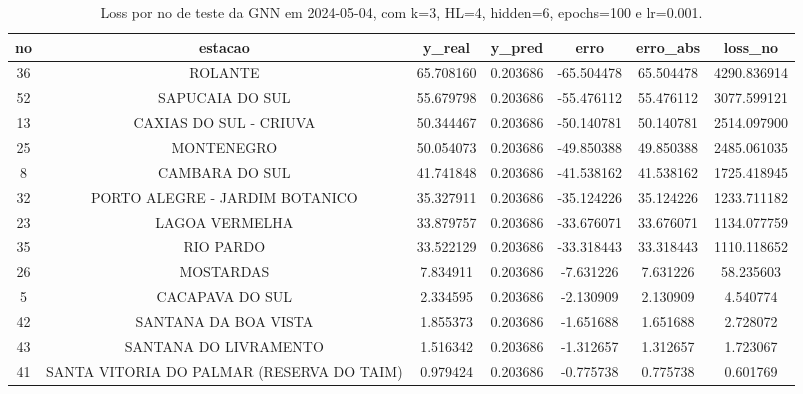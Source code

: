 \begin{table}[h]
\centering
\caption{Loss por no de teste da GNN em 2024-05-04, com k=3, HL=4, hidden=6, epochs=100 e lr=0.001.}
\label{tab:gnn_loss_k3_hl4_h6_e100_d20240504}
\begin{tabular}{ccccccc}
\toprule
no & estacao & y\_real & y\_pred & erro & erro\_abs & loss\_no \\
\midrule
36 & ROLANTE & 65.708160 & 0.203686 & -65.504478 & 65.504478 & 4290.836914 \\
52 & SAPUCAIA DO SUL & 55.679798 & 0.203686 & -55.476112 & 55.476112 & 3077.599121 \\
13 & CAXIAS DO SUL - CRIUVA & 50.344467 & 0.203686 & -50.140781 & 50.140781 & 2514.097900 \\
25 & MONTENEGRO & 50.054073 & 0.203686 & -49.850388 & 49.850388 & 2485.061035 \\
8 & CAMBARA DO SUL & 41.741848 & 0.203686 & -41.538162 & 41.538162 & 1725.418945 \\
32 & PORTO ALEGRE - JARDIM BOTANICO & 35.327911 & 0.203686 & -35.124226 & 35.124226 & 1233.711182 \\
23 & LAGOA VERMELHA & 33.879757 & 0.203686 & -33.676071 & 33.676071 & 1134.077759 \\
35 & RIO PARDO & 33.522129 & 0.203686 & -33.318443 & 33.318443 & 1110.118652 \\
26 & MOSTARDAS & 7.834911 & 0.203686 & -7.631226 & 7.631226 & 58.235603 \\
5 & CACAPAVA DO SUL & 2.334595 & 0.203686 & -2.130909 & 2.130909 & 4.540774 \\
42 & SANTANA DA BOA VISTA & 1.855373 & 0.203686 & -1.651688 & 1.651688 & 2.728072 \\
43 & SANTANA DO LIVRAMENTO & 1.516342 & 0.203686 & -1.312657 & 1.312657 & 1.723067 \\
41 & SANTA VITORIA DO PALMAR (RESERVA DO TAIM) & 0.979424 & 0.203686 & -0.775738 & 0.775738 & 0.601769 \\
\bottomrule
\end{tabular}
\end{table}

